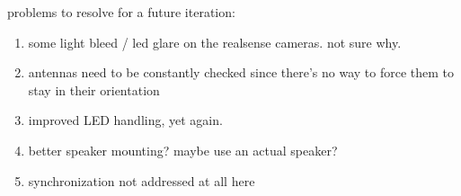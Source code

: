problems to resolve for a future iteration:
\begin{enumerate}
	\item some light bleed / led glare on the realsense cameras. not sure why.
	\item antennas need to be constantly checked since there's no way to force them to stay in their orientation
	\item improved LED handling, yet again.
	\item better speaker mounting? maybe use an actual speaker?
	\item synchronization not addressed at all here
\end{enumerate}
